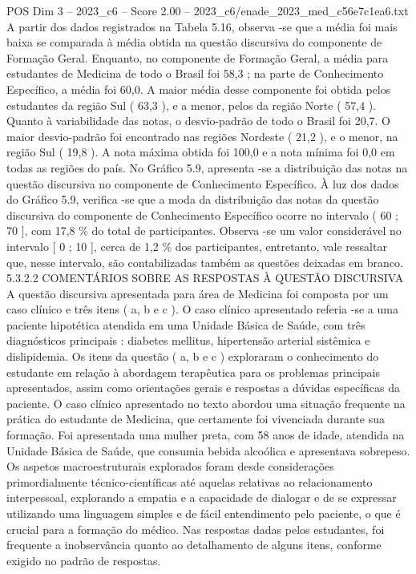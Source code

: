 \begin{textsample}{POS Dim 3 – 2023\_c6 – Score 2.00 – 2023\_c6/enade\_2023\_med\_c56e7c1ea6.txt}
A partir dos dados registrados na Tabela 5.16, observa -se que a média foi mais baixa se comparada à média obtida na questão discursiva do componente de Formação Geral.
Enquanto, no componente de Formação Geral, a média para estudantes de Medicina de todo o Brasil foi 58,3 ; na parte de Conhecimento Específico, a média foi 60,0.
A maior média desse componente foi obtida pelos estudantes da região Sul ( 63,3 ), e a menor, pelos da região Norte ( 57,4 ).
Quanto à variabilidade das notas, o desvio-padrão de todo o Brasil foi 20,7.
O maior desvio-padrão foi encontrado nas regiões Nordeste ( 21,2 ), e o menor, na região Sul ( 19,8 ).
A nota máxima obtida foi 100,0 e a nota mínima foi 0,0 em todas as regiões do país.
No Gráfico 5.9, apresenta -se a distribuição das notas na questão discursiva no componente de Conhecimento Específico.
À luz dos dados do Gráfico 5.9, verifica -se que a moda da distribuição das notas da questão discursiva do componente de Conhecimento Específico ocorre no intervalo ( 60 ; 70 ], com 17,8 \% do total de participantes.
Observa -se um valor considerável no intervalo [ 0 ; 10 ], cerca de 1,2 \% dos participantes, entretanto, vale ressaltar que, nesse intervalo, são contabilizadas também as questões deixadas em branco. 5.3.2.2 COMENTÁRIOS SOBRE AS RESPOSTAS À QUESTÃO DISCURSIVA A questão discursiva apresentada para área de Medicina foi composta por um caso clínico e três itens ( a, b e c ).
O caso clínico apresentado referia -se a uma paciente hipotética atendida em uma Unidade Básica de Saúde, com três diagnósticos principais : diabetes mellitus, hipertensão arterial sistêmica e dislipidemia.
Os itens da questão ( a, b e c ) exploraram o conhecimento do estudante em relação à abordagem terapêutica para os problemas principais apresentados, assim como orientações gerais e respostas a dúvidas específicas da paciente.
O caso clínico apresentado no texto abordou uma situação frequente na prática do estudante de Medicina, que certamente foi vivenciada durante sua formação.
Foi apresentada uma mulher preta, com 58 anos de idade, atendida na Unidade Básica de Saúde, que consumia bebida alcoólica e apresentava sobrepeso.
Os aspetos macroestruturais explorados foram desde considerações primordialmente técnico-científicas até aquelas relativas ao relacionamento interpessoal, explorando a empatia e a capacidade de dialogar e de se expressar utilizando uma linguagem simples e de fácil entendimento pelo paciente, o que é crucial para a formação do médico.
Nas respostas dadas pelos estudantes, foi frequente a inobservância quanto ao detalhamento de alguns itens, conforme exigido no padrão de respostas.

\end{textsample}
